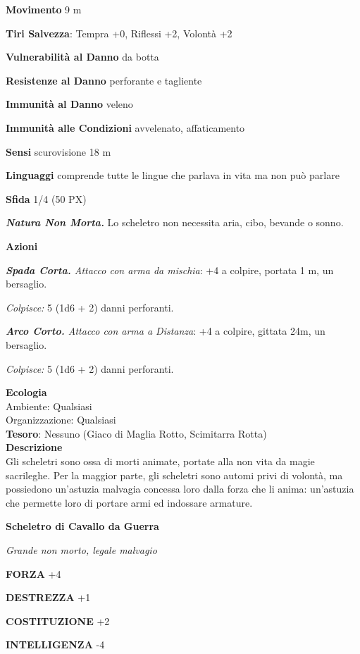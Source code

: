 \begin{multicols}{2}
\textbf{Movimento} 9 m

\textbf{Tiri Salvezza}: Tempra +0, Riflessi +2, Volontà +2

\textbf{Vulnerabilità al Danno} da botta

\textbf{Resistenze al Danno} perforante e tagliente

\textbf{Immunità al Danno} veleno

\textbf{Immunità alle Condizioni} avvelenato, affaticamento

\textbf{Sensi} scurovisione 18 m

\textbf{Linguaggi} comprende tutte le lingue che parlava in vita ma non può parlare

\textbf{Sfida} 1/4 (50 PX)

\textit{\textbf{Natura Non Morta.}} Lo scheletro non necessita aria, cibo, bevande o sonno.

\textbf{Azioni}

\textit{\textbf{Spada Corta.} Attacco con arma da mischia}: +4 a colpire, portata 1 m, un bersaglio.

\textit{Colpisce:} 5 (1d6 + 2) danni perforanti.

\textit{\textbf{Arco Corto.} Attacco con arma a Distanza}: +4 a colpire, gittata 24m, un bersaglio.

\textit{Colpisce:} 5 (1d6 + 2) danni perforanti.

\textbf{Ecologia}\\
Ambiente: Qualsiasi\\
Organizzazione: Qualsiasi\\
\textbf{Tesoro}: Nessuno (Giaco di Maglia Rotto, Scimitarra Rotta)\\
\textbf{Descrizione}\\
Gli scheletri sono ossa di morti animate, portate alla non vita da magie sacrileghe. Per la maggior parte, gli scheletri sono automi privi di volontà, ma possiedono un'astuzia malvagia concessa loro dalla forza che li anima: un'astuzia che permette loro di portare armi ed indossare armature.

\medskip{}\textbf{Scheletro di Cavallo da Guerra}

\textit{Grande non morto, legale malvagio}

\textbf{FORZA} +4

\textbf{DESTREZZA} +1

\textbf{COSTITUZIONE} +2

\textbf{INTELLIGENZA} -4


\end{multicols}
